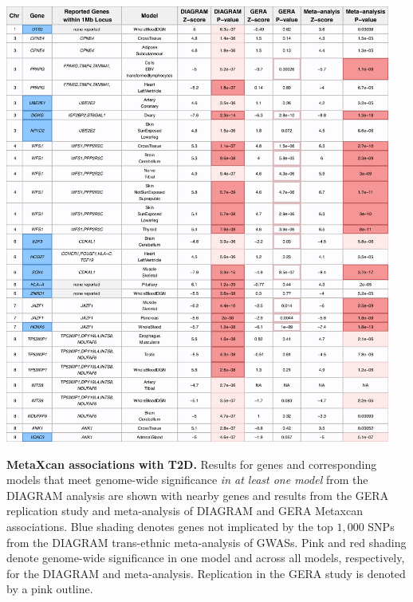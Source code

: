 \documentclass[10pt]{article}
\begin{document}
\begin{table}
\includegraphics[width=0.95\textwidth]{table1_part1.png}
\caption{\textbf{MetaXcan associations with T2D.} Results for genes and corresponding models that meet genome-wide significance \textit{in at least one model} from the DIAGRAM analysis are shown with nearby genes and results from the GERA replication study and meta-analysis of DIAGRAM and GERA Metaxcan associations. Blue shading denotes genes not implicated by the top $1,000$ SNPs from the DIAGRAM trans-ethnic meta-analysis of GWASs. Pink and red shading denote genome-wide significance in one model and across all models, respectively, for the DIAGRAM and meta-analysis. Replication in the GERA study is denoted by a pink outline.} 
\label{tab:table1.part1}
\end{table}
\end{document}
